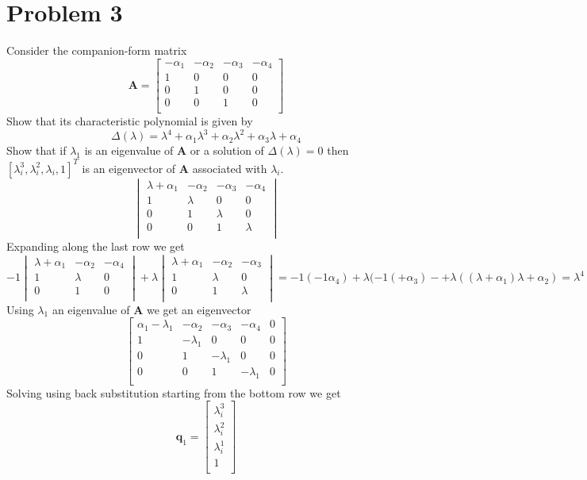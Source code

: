 \documentclass{article}
\begin{document}
\section*{Problem 3}
Consider the companion-form matrix
$$
\mathbf{A}
=
\begin{bmatrix}
-\alpha_1 & -\alpha_2 & -\alpha_3 & -\alpha_4 \\
1 & 0 & 0 & 0 \\
0 & 1 & 0 & 0 \\
0 & 0 & 1 & 0 \\
\end{bmatrix}
$$
Show that its characteristic polynomial is given by
$$\Delta (\lambda) = \lambda^4 + \alpha_1 \lambda^3 + \alpha_2 \lambda^2 + \alpha_3 \lambda + \alpha_4 $$
Show that if $\lambda_1$ is an eigenvalue of $\mathbf{A}$ or a solution of $\Delta (\lambda) = 0 $ then
$[ \lambda_i^3, \lambda_i^2, \lambda_i, 1]^T$ is an eigenvector of $\mathbf{A}$ associated with $\lambda_i$.
\newline
\newline
$$
\begin{vmatrix}
\lambda +\alpha_1 & -\alpha_2 & -\alpha_3 & -\alpha_4 \\
1 & \lambda & 0 & 0 \\
0 & 1 & \lambda & 0 \\
0 & 0 & 1 & \lambda \\
\end{vmatrix}
$$
Expanding along the last row we get
$$
-1
\begin{vmatrix}
\lambda+\alpha_1 & -\alpha_2 & -\alpha_4 \\
1 & \lambda & 0 \\
0 & 1 & 0 \\
\end{vmatrix}
+ \lambda
\begin{vmatrix}
\lambda + \alpha_1 & -\alpha_2 & -\alpha_3 \\
1 & \lambda & 0 \\
0 & 1 & \lambda \\
\end{vmatrix}
=
-1(-1\alpha_4) + \lambda(-1(+\alpha_3) -+\lambda((\lambda+\alpha_1)\lambda + \alpha_2)
= \lambda^4 + \alpha_1 \lambda^3 + \alpha_2 \lambda^2 + \alpha_3 \lambda + \alpha_4
$$
Using $\lambda_1$ an eigenvalue of $\mathbf{A}$ we get an eigenvector
$$
\left[
\begin{array}{cccc|c}
\alpha_1 - \lambda_1 & -\alpha_2 & -\alpha_3 & -\alpha_4  & 0\\
1 & -\lambda_1 & 0 & 0 & 0 \\
0 & 1 & -\lambda_1 & 0 & 0 \\
0 & 0 & 1 & -\lambda_1 & 0 \\
\end{array}
\right]
$$
Solving using back substitution starting from the bottom row we get
$$
\mathbf{q}_1
=
\begin{bmatrix}
\lambda_i^3 \\
\lambda_i^2 \\
\lambda_i^1 \\
1 \\
\end{bmatrix}
$$
\end{document}
